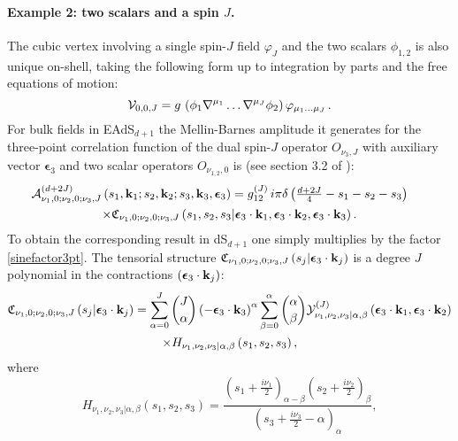 \documentclass[11pt,a4paper]{article}
\begin{document}
\paragraph{Example 2: two scalars and a spin $J$.} The cubic vertex involving a single spin-$J$ field $\varphi_J$ and the two scalars $\phi_{1,2}$ is also unique on-shell, taking the following form up to integration by parts and the free equations of motion:
\begin{equation}\label{00Jcanonicalcoupling}
    {\cal V}_{0,0,J} = g\,\left(\phi_1 \nabla^{\mu_1} \ldots \nabla^{\mu_J} \phi_2\right)\varphi_{\mu_1 \ldots \mu_J}\,.
\end{equation}
For bulk fields in EAdS$_{d+1}$ the Mellin-Barnes amplitude it generates for the three-point correlation function of the dual spin-$J$ operator $O_{\nu_3,J}$ with auxiliary vector $\boldsymbol{\epsilon}_3$ and two scalar operators $O_{\nu_{1,2},0}$ is (see section 3.2 of \cite{Sleight:2019hfp}):
\begin{multline}\label{00J3pt}
 \hspace*{-0.5cm}    {\cal A}^{\left(d+2J\right)}_{\nu_1,0;\nu_2,0;\nu_3,J}\left(s_1,{\bf k}_1;s_2,{\bf k}_2;s_3,{\bf k}_3,\boldsymbol{\epsilon}_3\right) = g^{\left(J\right)}_{12}\, i \pi \delta\left(\tfrac{d+2J}{4}-s_1-s_2-s_3\right)\, \\ \times  \mathfrak{C}_{\nu_1,0;\nu_2,0;\nu_3,J}\left(s_1,s_2,s_3|\boldsymbol{\epsilon}_3 \cdot {\bf k}_1,\boldsymbol{\epsilon}_3 \cdot {\bf k}_2,\boldsymbol{\epsilon}_3 \cdot {\bf k}_3\right).
\end{multline}
To obtain the corresponding result in dS$_{d+1}$ one simply multiplies by the factor \eqref{sinefactor3pt}. The tensorial structure $\mathfrak{C}_{\nu_1,0;\nu_2,0;\nu_3,J}\left(s_j|\boldsymbol{\epsilon}_3 \cdot {\bf k}_j\right)$ is a degree $J$ polynomial in the contractions $\left(\boldsymbol{\epsilon}_3 \cdot {\bf k}_j\right)$:
\begin{multline}\label{tensor00J}
 \mathfrak{C}_{\nu_1,0;\nu_2,0;\nu_3,J}\left(s_j|\boldsymbol{\epsilon}_3 \cdot {\bf k}_j\right)=\sum^J_{\alpha=0}\binom{J}{\alpha} \left(- \boldsymbol{\epsilon}_3 \cdot {\bf k}_3\right)^\alpha \sum^\alpha_{\beta=0}\binom{\alpha}{\beta} {\cal Y}^{\left(J\right)}_{\nu_1,\nu_2,\nu_3|\alpha,\beta}\left(\boldsymbol{\epsilon}_3 \cdot {\bf k}_1,\boldsymbol{\epsilon}_3 \cdot {\bf k}_2\right)\\ \times  H_{\nu_1,\nu_2,\nu_3|\alpha,\beta}\left(s_1,s_2,s_3\right),
\end{multline}
where
\begin{equation}\label{Hab}
    H_{\nu_1,\nu_2,\nu_3|\alpha,\beta}\left(s_1,s_2,s_3\right) = \frac{\left(s_1+\frac{i\nu_1}{2}\right)_{\alpha-\beta}\left(s_2+\frac{i\nu_2}{2}\right)_{\beta}}{\left(s_3+\frac{i\nu_3}{2}-\alpha\right)_\alpha},
\end{equation}
\end{document}
